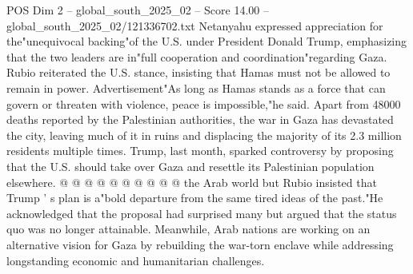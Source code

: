 \begin{textsample}{POS Dim 2 – global\_south\_2025\_02 – Score 14.00 – global\_south\_2025\_02/121336702.txt}
Netanyahu expressed appreciation for the"unequivocal backing"of the U.S. under President Donald Trump, emphasizing that the two leaders are in"full cooperation and coordination"regarding Gaza.
Rubio reiterated the U.S. stance, insisting that Hamas must not be allowed to remain in power.
Advertisement"As long as Hamas stands as a force that can govern or threaten with violence, peace is impossible,"he said.
Apart from 48000 deaths reported by the Palestinian authorities, the war in Gaza has devastated the city, leaving much of it in ruins and displacing the majority of its 2.3 million residents multiple times.
Trump, last month, sparked controversy by proposing that the U.S. should take over Gaza and resettle its Palestinian population elsewhere. @ @ @ @ @ @ @ @ @ @ the Arab world but Rubio insisted that Trump ' s plan is a"bold departure from the same tired ideas of the past."He acknowledged that the proposal had surprised many but argued that the status quo was no longer attainable.
Meanwhile, Arab nations are working on an alternative vision for Gaza by rebuilding the war-torn enclave while addressing longstanding economic and humanitarian challenges.

\end{textsample}
